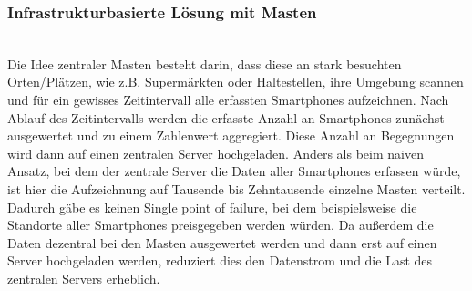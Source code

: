 \documentclass[conference,compsoc]{IEEEtran}
\begin{document}
\subsubsection{Infrastrukturbasierte Lösung mit Masten}
\text{ }\\
Die Idee zentraler Masten besteht darin, dass diese an stark besuchten Orten/Plätzen, wie z.B. Supermärkten oder Haltestellen, ihre Umgebung scannen und für ein gewisses Zeitintervall alle erfassten Smartphones aufzeichnen. 
Nach Ablauf des Zeitintervalls werden die erfasste Anzahl an Smartphones zunächst ausgewertet und zu einem Zahlenwert aggregiert.
Diese Anzahl an Begegnungen wird dann auf einen zentralen Server hochgeladen.
Anders als beim naiven Ansatz, bei dem der zentrale Server die Daten aller Smartphones erfassen würde, ist hier die Aufzeichnung auf Tausende bis Zehntausende einzelne Masten verteilt. 
Dadurch gäbe es keinen \glqq Single point of failure\grqq, bei dem beispielsweise die Standorte aller Smartphones preisgegeben werden würden. 
Da außerdem die Daten dezentral bei den Masten ausgewertet werden und dann erst auf einen Server hochgeladen werden, reduziert dies den Datenstrom und die Last des zentralen Servers erheblich. 
\end{document}
